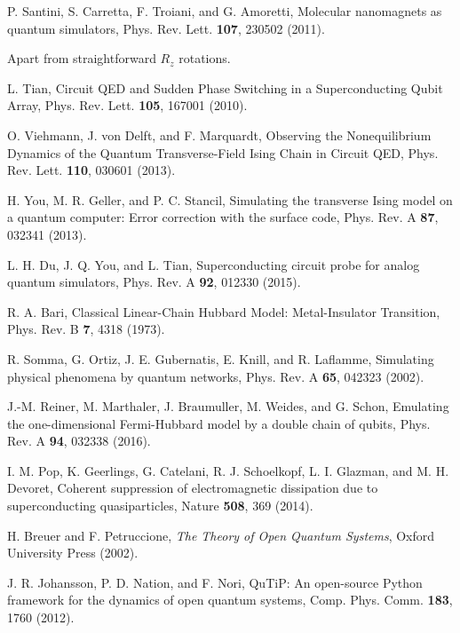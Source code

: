\documentclass[aps,twocolumn,groupedaddress,superscriptaddress,floatfix,amsmath,amssymb,prb]{revtex4-1}
\begin{document}
\begin{thebibliography}{99}
P. Santini, S. Carretta, F. Troiani, and G. Amoretti,  
{Molecular nanomagnets as quantum simulators},
Phys. Rev. Lett. {\bf 107}, 230502 (2011).
	
Apart from straightforward $R_z$ rotations.

{L. Tian, 
Circuit QED and Sudden Phase Switching in a Superconducting Qubit Array,
Phys. Rev. Lett. {\bf 105}, 167001 (2010).}

{O. Viehmann, J. von Delft, and F. Marquardt, 
Observing the Nonequilibrium Dynamics of the Quantum Transverse-Field Ising Chain in Circuit QED,
Phys. Rev. Lett. {\bf 110}, 030601 (2013).}

{H. You, M. R. Geller, and P. C. Stancil, 
Simulating the transverse Ising model on a quantum computer: Error correction with the surface code, 
Phys. Rev. A {\bf 87}, 032341 (2013).}

{L. H. Du, J. Q. You, and L. Tian, 
Superconducting circuit probe for analog quantum simulators,
Phys. Rev. A {\bf 92}, 012330 (2015).}

R. A. Bari, 
Classical Linear-Chain Hubbard Model: Metal-Insulator Transition,
Phys. Rev. B {\bf 7}, 4318 (1973).

R. Somma, G. Ortiz, J. E. Gubernatis, E. Knill, and R. Laflamme, 
Simulating physical phenomena by quantum networks,
Phys. Rev. A {\bf 65}, 042323 (2002).

{J.-M. Reiner, M. Marthaler, J. Braumuller, M. Weides, and G. Schon, 
Emulating the one-dimensional Fermi-Hubbard model by a double chain of qubits,
Phys. Rev. A {\bf 94}, 032338 (2016).}

{I. M. Pop, K. Geerlings, G. Catelani, R. J. Schoelkopf, L. I. Glazman, and M. H. Devoret,
Coherent suppression of electromagnetic dissipation due to superconducting quasiparticles,
Nature {\bf 508}, 369 (2014).}

H. Breuer and F. Petruccione, 
\textit{The Theory of Open Quantum Systems}, Oxford University Press (2002).

J. R. Johansson, P. D. Nation, and F. Nori, 
{QuTiP: An open-source Python framework for the dynamics of open quantum systems}, 
Comp. Phys. Comm. {\bf 183}, 1760 (2012).



\end{thebibliography}
\end{document}
